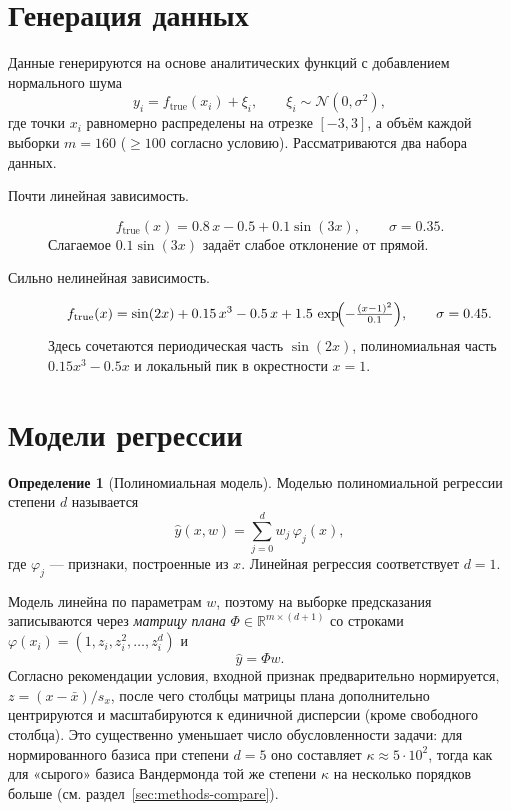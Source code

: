 \documentclass[a4paper,12pt]{article}
\newcommand{\R}{\mathbb{R}}
\theoremstyle{definition}
\newtheorem{definition}{Определение}[section]
\begin{document}
\section{Генерация данных}

Данные генерируются на основе аналитических функций с добавлением нормального шума
\[
    y_i = f_{\text{true}}(x_i) + \xi_i, \qquad \xi_i \sim \mathcal{N}(0, \sigma^2),
\]
где точки $x_i$ равномерно распределены на отрезке $[-3, 3]$, а объём каждой выборки $m = 160$
($\geq 100$ согласно условию). Рассматриваются два набора данных.

\begin{description}
    \item[Почти линейная зависимость.]
        \[
            f_{\text{true}}(x) = 0.8\,x - 0.5 + 0.1 \sin(3x), \qquad \sigma = 0.35.
        \]
        Слагаемое $0.1\sin(3x)$ задаёт слабое отклонение от прямой.
    \item[Сильно нелинейная зависимость.]
        \[
            f_{\text{true}}(x) = \sin(2x) + 0.15\,x^3 - 0.5\,x
            + 1.5\,\exp\!\Bigl(-\tfrac{(x-1)^2}{0.1}\Bigr), \qquad \sigma = 0.45.
        \]
        Здесь сочетаются периодическая часть $\sin(2x)$, полиномиальная часть $0.15x^3 - 0.5x$
        и локальный пик в окрестности $x = 1$.
\end{description}

\section{Модели регрессии}

\begin{definition}[Полиномиальная модель]
    Моделью полиномиальной регрессии степени $d$ называется
    \[
        \widehat{y}(x, w) = \sum_{j=0}^{d} w_j\, \varphi_j(x),
    \]
    где $\varphi_j$ — признаки, построенные из $x$. Линейная регрессия соответствует $d = 1$.
\end{definition}

Модель линейна по параметрам $w$, поэтому на выборке предсказания записываются через
\emph{матрицу плана} $\Phi \in \R^{m \times (d+1)}$ со строками
$\varphi(x_i) = (1, z_i, z_i^2, \dots, z_i^d)$ и
\[
    \widehat{y} = \Phi w.
\]
Согласно рекомендации условия, входной признак предварительно нормируется,
$z = (x - \bar{x}) / s_x$, после чего столбцы матрицы плана дополнительно центрируются и
масштабируются к единичной дисперсии (кроме свободного столбца). Это существенно уменьшает
число обусловленности задачи: для нормированного базиса при степени $d=5$ оно составляет
$\kappa \approx 5\cdot 10^2$, тогда как для «сырого» базиса Вандермонда той же степени
$\kappa$ на несколько порядков больше (см. раздел~\ref{sec:methods-compare}).
\end{document}
